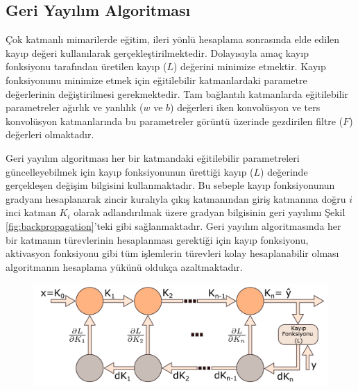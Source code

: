 \subsection{Geri Yayılım Algoritması}
Çok katmanlı mimarilerde eğitim, ileri yönlü hesaplama sonrasında elde edilen kayıp değeri kullanılarak gerçekleştirilmektedir. Dolayısıyla amaç kayıp fonksiyonu tarafından üretilen kayıp ($L$) değerini minimize etmektir. Kayıp fonksiyonunu minimize etmek için eğitilebilir katmanlardaki parametre değerlerinin değiştirilmesi gerekmektedir. Tam bağlantılı katmanlarda eğitilebilir parametreler ağırlık ve yanlılık ($w$ ve $b$) değerleri iken konvolüsyon ve ters konvolüsyon katmanlarında bu parametreler görüntü üzerinde gezdirilen filtre ($F$) değerleri olmaktadır.  

Geri yayılım algoritması her bir katmandaki eğitilebilir parametreleri güncelleyebilmek için kayıp fonksiyonunun ürettiği kayıp ($L$) değerinde gerçekleşen değişim bilgisini kullanmaktadır. Bu sebeple kayıp fonksiyonunun gradyanı hesaplanarak zincir kuralıyla çıkış katmanından giriş katmanına doğru $i$ inci katman $K_{i}$ olarak adlandırılmak üzere gradyan bilgisinin geri yayılımı Şekil \ref{fig:backpropagation}'teki gibi sağlanmaktadır. Geri yayılım algoritmasında her bir katmanın türevlerinin hesaplanması gerektiği için kayıp fonksiyonu, aktivasyon fonksiyonu gibi tüm işlemlerin türevleri kolay hesaplanabilir olması algoritmanın hesaplama yükünü oldukça azaltmaktadır.


\begin{figure}[h!]
	\begin{center}
		\vspace{0.4cm}
		{
			\vspace{0.4cm}
			\includegraphics[scale=0.55]{Yapilan-Calismalar/Figures/backpropagation.pdf}
		}
	\end{center}
\end{figure}

